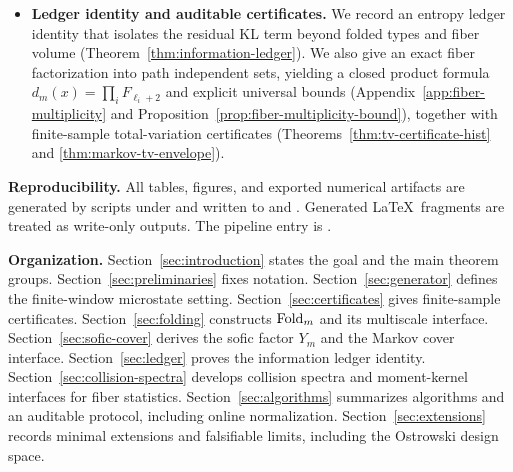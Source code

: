 \begin{itemize}
  \item \textbf{Ledger identity and auditable certificates.} We record an entropy ledger identity that isolates the residual KL term beyond folded types and fiber volume (Theorem~\ref{thm:information-ledger}). We also give an exact fiber factorization into path independent sets, yielding a closed product formula $d_m(x)=\prod_i F_{\ell_i+2}$ and explicit universal bounds (Appendix~\ref{app:fiber-multiplicity} and Proposition~\ref{prop:fiber-multiplicity-bound}), together with finite-sample total-variation certificates (Theorems~\ref{thm:tv-certificate-hist} and \ref{thm:markov-tv-envelope}).
\end{itemize}

\bigskip
\noindent\textbf{Reproducibility.}
All tables, figures, and exported numerical artifacts are generated by scripts under  and written to  and . Generated \LaTeX\ fragments are treated as write-only outputs. The pipeline entry is .

\bigskip
\noindent\textbf{Organization.}
Section~\ref{sec:introduction} states the goal and the main theorem groups.
Section~\ref{sec:preliminaries} fixes notation.
Section~\ref{sec:generator} defines the finite-window microstate setting.
Section~\ref{sec:certificates} gives finite-sample certificates.
Section~\ref{sec:folding} constructs $\mathrm{Fold}_m$ and its multiscale interface.
Section~\ref{sec:sofic-cover} derives the sofic factor $Y_m$ and the Markov cover interface.
Section~\ref{sec:ledger} proves the information ledger identity.
Section~\ref{sec:collision-spectra} develops collision spectra and moment-kernel interfaces for fiber statistics.
Section~\ref{sec:algorithms} summarizes algorithms and an auditable protocol, including online normalization.
Section~\ref{sec:extensions} records minimal extensions and falsifiable limits, including the Ostrowski design space.

